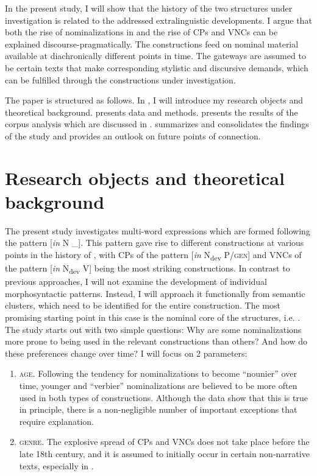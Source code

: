 \documentclass[output=paper,colorlinks,citecolor=brown]{langscibook}
\begin{document}
In the present study, I will show that the history of the two structures under investigation is related to the addressed extralinguistic developments. I argue that both the rise of nominalizations in  and the rise of CPs and VNCs can be explained discourse-pragmatically. The constructions feed on nominal material available at diachronically different points in time. The gateways are assumed to be certain texts that make corresponding stylistic and discursive demands, which can be fulfilled through the constructions under investigation. 

The paper is structured as follows. In , I will introduce my research objects and theoretical background.  presents data and methods.  presents the results of the corpus analysis which are discussed in .  summarizes and consolidates the findings of the study and provides an outlook on future points of connection.


\section{Research objects and theoretical background}\label{sec:fleissner:2}

The present study investigates multi-word expressions which are formed following the pattern [\textit{in} N \_]. This pattern gave rise to different constructions at various points in the history of , with CPs of the pattern [\textit{in} N\textsubscript{dev} P/\textsc{gen}] and VNCs of the pattern [\textit{in} N\textsubscript{dev} V] being the most striking constructions. In contrast to previous approaches, I will not examine the development of individual morphosyntactic patterns. Instead, I will approach it functionally from semantic clusters, which need to be identified for the entire construction. The most promising starting point in this case is the nominal core of the structures, i.e. . The study starts out with two simple questions: Why are some nominalizations more prone to being used in the relevant constructions than others? And how do these preferences change over time? I will focus on 2 parameters:

\begin{enumerate}[label=(\roman*)]
\item
\textsc{age}. Following the tendency for nominalizations to become ``nounier'' over time, younger and ``verbier'' nominalizations are believed to be more often used in both types of constructions. Although the data show that this is true in principle, there is a non-negligible number of important exceptions that require explanation.
\item 
\textsc{genre}. The explosive spread of CPs and VNCs does not take place before the late 18th century, and it is assumed to initially occur in certain non-narrative texts, especially in .
\end{enumerate}
\end{document}
